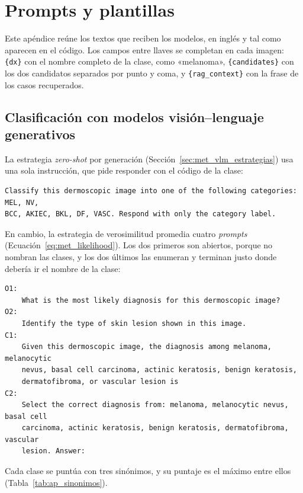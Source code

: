 \chapter{Prompts y plantillas}
\label{ap:prompts}

Este apéndice reúne los textos que reciben los modelos, en inglés y tal como aparecen en el código. Los campos
entre llaves se completan en cada imagen: \texttt{\{dx\}} con el nombre completo de la clase, como
«melanoma», \texttt{\{candidates\}} con los dos candidatos separados por punto y coma, y
\texttt{\{rag\_context\}} con la frase de los casos recuperados.

\section{Clasificación con modelos visión--lenguaje generativos}

La estrategia \emph{zero-shot} por generación (Sección~\ref{sec:met_vlm_estrategias}) usa una sola instrucción,
que pide responder con el código de la clase:
\begin{verbatim}
Classify this dermoscopic image into one of the following categories: MEL, NV,
BCC, AKIEC, BKL, DF, VASC. Respond with only the category label.
\end{verbatim}

En cambio, la estrategia de verosimilitud promedia cuatro \emph{prompts} (Ecuación~\ref{eq:met_likelihood}). Los
dos primeros son abiertos, porque no nombran las clases, y los dos últimos las enumeran y terminan justo donde
debería ir el nombre de la clase:
\begin{verbatim}
O1:
    What is the most likely diagnosis for this dermoscopic image?
O2:
    Identify the type of skin lesion shown in this image.
C1:
    Given this dermoscopic image, the diagnosis among melanoma, melanocytic
    nevus, basal cell carcinoma, actinic keratosis, benign keratosis,
    dermatofibroma, or vascular lesion is
C2:
    Select the correct diagnosis from: melanoma, melanocytic nevus, basal cell
    carcinoma, actinic keratosis, benign keratosis, dermatofibroma, vascular
    lesion. Answer:
\end{verbatim}
Cada clase se puntúa con tres sinónimos, y su puntaje es el máximo entre ellos (Tabla~\ref{tab:ap_sinonimos}).

